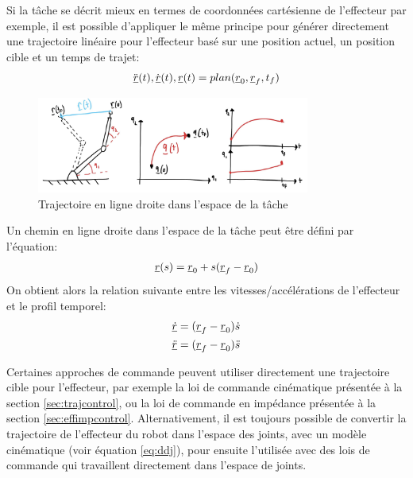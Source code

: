 Si la tâche se décrit mieux en termes de coordonnées cartésienne de l'effecteur par exemple, il est possible d'appliquer le même principe pour générer directement une trajectoire linéaire pour l'effecteur basé sur une position actuel, un position cible et un temps de trajet:
\begin{align}
  \ddot{\underline{r}}(t),\dot{\underline{r}}(t),\underline{r}(t) = plan(\underline{r}_{0}, \underline{r}_f, t_f)
	\label{eq:trajgen}
\end{align}
\begin{figure}[ht]
	\centering
		\includegraphics[width=0.80\textwidth]{fig/traj_eff_line.jpeg}
	\caption{Trajectoire en ligne droite dans l'espace de la tâche}
	\label{fig:traj_eff_line}
\end{figure}

Un chemin en ligne droite dans l'espace de la tâche peut être défini par l'équation:
\begin{align}
  \underline{r}(s) = \underline{r}_0 + s ( \underline{r}_f - \underline{r}_0 )
\end{align}
On obtient alors la relation suivante entre les vitesses/accélérations de l'effecteur et le profil temporel:
\begin{align}
  \underline{\dot{r}} &= ( \underline{r}_f - \underline{r}_0 ) \dot{s}
  \\
  \underline{\ddot{r}} &= ( \underline{r}_f - \underline{r}_0 ) \ddot{s}
\end{align}

Certaines approches de commande peuvent utiliser directement une trajectoire cible pour l'effecteur, par exemple la loi de commande cinématique présentée à la section \ref{sec:trajcontrol}, ou la loi de commande en impédance présentée à la section \ref{sec:effimpcontrol}. Alternativement, il est toujours possible de convertir la trajectoire de l'effecteur du robot dans l'espace des joints, avec un modèle cinématique (voir équation
\eqref{eq:ddj}), pour ensuite l'utilisée avec des lois de commande qui travaillent directement dans l'espace de joints.


